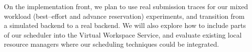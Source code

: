 On the implementation front, we plan to use real submission traces for our mixed workload (best--effort and advance reservation) experiments, and transition from a simulated backend to a real backend. We will also explore how to include parts of our scheduler into the Virtual Workspace Service, and evaluate existing local resource managers where our scheduling techniques could be integrated.
